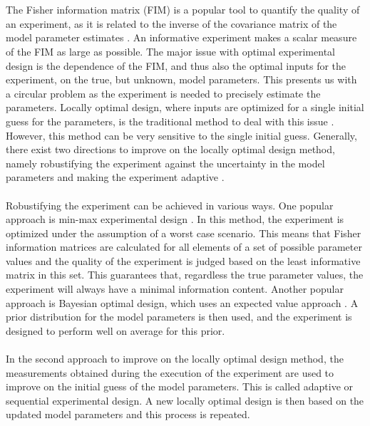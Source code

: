 \\
\\
The Fisher information matrix (FIM) is a popular tool to quantify the quality of an experiment, as it is related to the inverse of the covariance matrix of the model parameter estimates \parencite{fedorov}. An informative experiment makes a scalar measure of the FIM as large as possible. The major issue with optimal experimental design is the dependence of the FIM, and thus also the optimal inputs for the experiment, on the true, but unknown, model parameters. This presents us with a circular problem as the experiment is needed to precisely estimate the parameters. Locally optimal design, where inputs are optimized for a single initial guess for the parameters, is the traditional method to deal with this issue \parencite{atkinson}. However, this method can be very sensitive to the single initial guess. Generally, there exist two directions to improve on the locally optimal design method, namely robustifying the experiment against the uncertainty in the model parameters and making the experiment adaptive \parencite{walter}.
\\
\\
Robustifying the experiment can be achieved in various ways. One popular approach is min-max experimental design \parencite{korkel}. In this method, the experiment is optimized under the assumption of a worst case scenario. This means that Fisher information matrices are calculated for all elements of a set of possible parameter values and the quality of the experiment is judged based on the least informative matrix in this set. This guarantees that, regardless the true parameter values, the experiment will always have a minimal information content. Another popular approach is Bayesian optimal design, which uses an expected value approach \parencite{chaloner}. A prior distribution for the model parameters is then used, and the experiment is designed to perform well on average for this prior.
\\
\\
In the second approach to improve on the locally optimal design method, the measurements obtained during the execution of the experiment are used to improve on the initial guess of the model parameters. This is called adaptive or sequential experimental design. A new locally optimal design is then based on the updated model parameters and this process is repeated.
\\
\\
